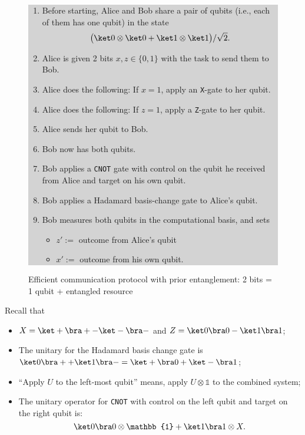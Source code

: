 \documentclass[a4paper,10pt,reqno,nonamelimits]{article}
\newcommand{\One}{\mathbb{1}}
\begin{document}
\begin{figure}[htp]
  \centering
  \colorbox{lightgray}{%
    \begin{minipage}{0.9\linewidth}
      \begin{enumerate}[start=0,label=\arabic*.]
      \item Before starting, Alice and Bob share a pair of qubits (i.e., each of them has one qubit) in the state
        \begin{equation*}
          \bigl( \ket0\otimes\ket0+\ket1\otimes\ket1 \bigr)/\sqrt2.
        \end{equation*}

      \item Alice is given 2 bits $x,z \in\{0,1\}$ with the task to send them to Bob.
      \item Alice does the following: If $x=1$, apply an \texttt{X}-gate  to her qubit.
      \item Alice does the following: If $z=1$, apply a  \texttt{Z}-gate  to her qubit.
      \item Alice sends her qubit to Bob.
      \item Bob now has both qubits.
      \item Bob applies a \texttt{CNOT} gate with control on the qubit he received from Alice and target
        on his own qubit.
      \item Bob applies a Hadamard basis-change gate to Alice's qubit.
      \item Bob measures both qubits in the computational basis, and sets
        \begin{itemize}
        \item $z' :=$ outcome from Alice's qubit
        \item $x' :=$ outcome from his own qubit.
        \end{itemize}
      \end{enumerate}
    \end{minipage}%
  }
  \caption{Efficient communication protocol with prior entanglement: 2 bits = 1 qubit + entangled
    resource}\label{fig:sdc}
\end{figure}
\medskip%
Recall that
\begin{itemize}
\item $X = \ket+\bra+ - \ket-\bra-$ and $Z=\ket0\bra0-\ket1\bra1$;
\item The unitary for the Hadamard basis change gate is $\ket0\bra+ + \ket1\bra- = \ket+\bra0 + \ket-\bra1$;
\item ``Apply $U$ to the left-most qubit'' means, apply $U\otimes \One$ to the combined system;
\item The unitary operator for \texttt{CNOT} with control on the left qubit and target on the right qubit is:
  \begin{equation*}
    \ket0\bra0\otimes\One + \ket1\bra1\otimes X.
  \end{equation*}
\end{itemize}
\end{document}
